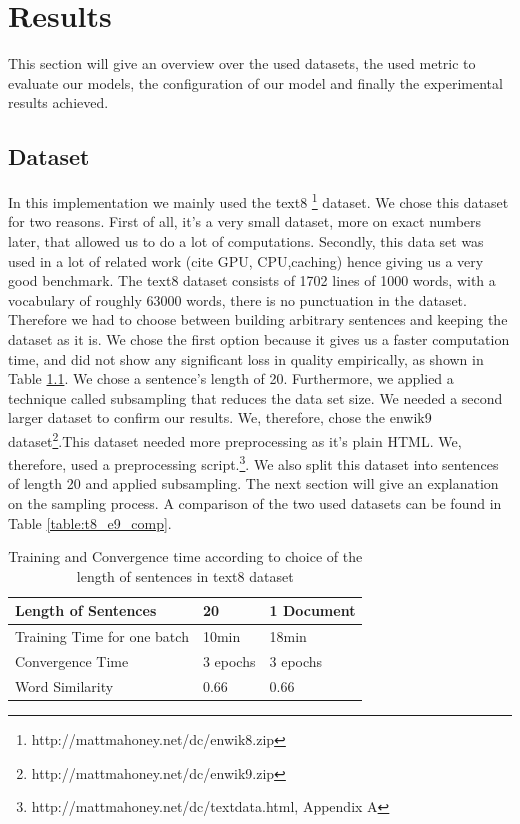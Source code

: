 
\chapter{Results}\label{chap:results}



This section will give an overview over the used datasets, the used metric to evaluate our models, the configuration of our model and finally the experimental results achieved.

\section{Dataset}\label{sec:dataset}
In this implementation we mainly used the text8 \footnote{http://mattmahoney.net/dc/enwik8.zip} dataset. We chose this dataset for two reasons. First of all, it's a very small dataset, more on exact numbers later, that allowed us to do a lot of computations. Secondly, this data set was used in a lot of related work (cite GPU, CPU,caching) hence giving us a very good benchmark. The text8 dataset consists of 1702 lines of 1000 words, with a vocabulary of roughly 63000 words, there is no punctuation in the dataset. Therefore we had to choose between building arbitrary sentences and keeping the dataset as it is. We chose the first option because it gives us a faster computation time, and did not show any significant loss in quality empirically, as shown in Table \ref{table:with_20}. We chose a sentence's length of 20. Furthermore, we applied a technique called subsampling that reduces the data set size. 
We needed a second larger dataset to confirm our results.  We, therefore, chose the enwik9 dataset\footnote{http://mattmahoney.net/dc/enwik9.zip}.This dataset needed more preprocessing as it's plain HTML. We, therefore, used a preprocessing script.\footnote{http://mattmahoney.net/dc/textdata.html, Appendix A}. We also split this dataset into sentences of length 20 and applied subsampling. The next section will give an explanation on the sampling process. A comparison of the two used datasets can be found in Table \ref{table:t8_e9_comp}.
\begin{table}[]
\centering
\begin{tabular}{|l|l|l|}
\hline
Length of Sentences            & 20       & 1 Document \\ \hline
Training Time for one batch  & 10min    & 18min      \\ \hline
Convergence Time & 3 epochs & 3 epochs   \\ \hline
Word Similarity  & 0.66     & 0.66       \\ \hline
\end{tabular}
\caption{Training and Convergence time according to choice of the length of sentences in text8 dataset}
    \label{table:with_20}
\end{table}

